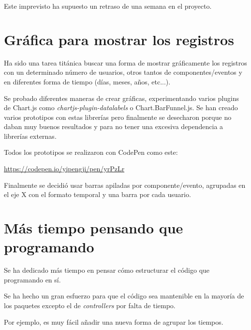 Este imprevisto ha supuesto un retraso de una semana en el proyecto.

\section{Gráfica para mostrar los registros}

Ha sido una tarea titánica buscar una forma de mostrar gráficamente los registros con un determinado número de usuarios, otros tantos de componentes/eventos y en diferentes forma de tiempo (días, meses, años, etc...).

Se probado diferentes maneras de crear gráficas, experimentando varios plugins de Chart.js\cite{noauthor_plugins_nodate} como \textit{chartjs-plugin-datalabels}\cite{noauthor_chartjs-plugin-datalabels_nodate} o Chart.BarFunnel.js\cite{y-takey_this_2019}. Se han creado varios prototipos con estas librerías pero finalmente se desecharon porque no daban muy buenos resultados y para no tener una excesiva dependencia a librerías externas.

Todos los prototipos se realizaron con CodePen como este:

\href{https://codepen.io/yipengji/pen/yrPzLr}{https://codepen.io/yipengji/pen/yrPzLr}


Finalmente se decidió usar barras apiladas por componente/evento, agrupadas en el eje X con el formato temporal y una barra por cada usuario.



\section{Más tiempo pensando que programando}

Se ha dedicado más tiempo en pensar cómo estructurar el código que programando en sí. 

Se ha hecho un gran esfuerzo para que el código sea mantenible en la mayoría de los paquetes excepto el de \textit{controllers} por falta de tiempo.

Por ejemplo, es muy fácil añadir una nueva forma de agrupar los tiempos.
